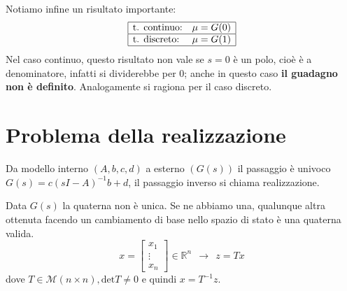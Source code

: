\documentclass[10pt,a4paper]{book}
\begin{document}
Notiamo infine un risultato importante:
\begin{equation*}
\begin{array}{|l c|}
\hline
\text{t. continuo:} & \mu =G(0)\\
\hline
\text{t. discreto:} & \mu =G(1)\\
\hline
\end{array}
\end{equation*}
Nel caso continuo, questo risultato non vale se $s=0$ è un polo, cioè è a denominatore, infatti si dividerebbe per $0$; anche in questo caso \textbf{il guadagno non è definito}. Analogamente si ragiona per il caso discreto.
\section{Problema della realizzazione}

Da modello interno $( A,b,c,d)$ a esterno $( G(s))$ il passaggio è univoco $G(s) =c( sI-A)^{-1} b+d$, il passaggio inverso si chiama realizzazione.

Data $G(s)$ la quaterna non è unica. Se ne abbiamo una, qualunque altra ottenuta facendo un cambiamento di base nello spazio di stato è una quaterna valida.
\begin{equation*}
x=\begin{bmatrix}
x_1\\
\vdots \\
x_n
\end{bmatrix} \in \mathbb{R}^n \ \ \rightarrow \ \ z=Tx
\end{equation*}
dove $T\in \mathcal{M}( n\times n) ,\mathrm{det} T\neq 0$ e quindi $x=T^{-1} z$.
\end{document}
